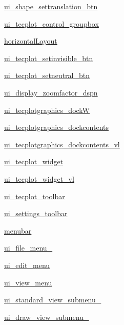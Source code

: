 \begin{DoxyCompactItemize}
\item 
\hyperlink{a00098_a7463f5748bcd87fed9c7aa83d70d7b4c}{ui\+\_\+shape\+\_\+settranslation\+\_\+btn}
\item 
\hyperlink{a00098_a1ed7a735f4879c9335af120f50f99554}{ui\+\_\+tecplot\+\_\+control\+\_\+groupbox}
\item 
\hyperlink{a00098_ae4ccda1baa67cbf1b90aeaf28c792f52}{horizontal\+Layout}
\item 
\hyperlink{a00098_a7efc66f5379a990bb2d613efad8af792}{ui\+\_\+tecplot\+\_\+setinvisible\+\_\+btn}
\item 
\hyperlink{a00098_a7a5d64ed74f4a2a389cfbd88660084ea}{ui\+\_\+tecplot\+\_\+setneutral\+\_\+btn}
\item 
\hyperlink{a00098_aab2a02b2ad9ef412370fa6ce21aba778}{ui\+\_\+display\+\_\+zoomfactor\+\_\+dspn}
\item 
\hyperlink{a00098_a6ac6813ef0dc08cb729b515d9edfd656}{ui\+\_\+tecplotgraphics\+\_\+dockW}
\item 
\hyperlink{a00098_a833a8408dc99f9eedbb331e8e360bdf5}{ui\+\_\+tecplotgraphics\+\_\+dockcontents}
\item 
\hyperlink{a00098_a9937dfdabe6438f3bfec3ba0c6976557}{ui\+\_\+tecplotgraphics\+\_\+dockcontents\+\_\+vl}
\item 
\hyperlink{a00098_a7e3ee3296fa5786336d90635c2442045}{ui\+\_\+tecplot\+\_\+widget}
\item 
\hyperlink{a00098_a617fa074367d63edd758567a5d67b398}{ui\+\_\+tecplot\+\_\+widget\+\_\+vl}
\item 
\hyperlink{a00098_afbd7bdb7c0f0d9d24bad52a80454d101}{ui\+\_\+tecplot\+\_\+toolbar}
\item 
\hyperlink{a00098_a34720910fa97b9e65de72cbee6a12803}{ui\+\_\+settings\+\_\+toolbar}
\item 
\hyperlink{a00098_a265e28ccad6c1cd4a94a22965fe6c536}{menubar}
\item 
\hyperlink{a00098_ad42c5a1028285e160bfb9eb048cd245b}{ui\+\_\+file\+\_\+menu\+\_\+}
\item 
\hyperlink{a00098_a791ff2e9d4693638b8e5220f53f1b8d2}{ui\+\_\+edit\+\_\+menu}
\item 
\hyperlink{a00098_aaf13351c59caceedfc932c46217b4cda}{ui\+\_\+view\+\_\+menu}
\item 
\hyperlink{a00098_a6d61f7e62a75570f3cbb6b5c9553081b}{ui\+\_\+standard\+\_\+view\+\_\+submenu\+\_\+}
\item 
\hyperlink{a00098_a5c5ae1d1afe30f77e2be3526c82acd05}{ui\+\_\+draw\+\_\+view\+\_\+submenu\+\_\+}
\item 

\end{DoxyCompactItemize}
